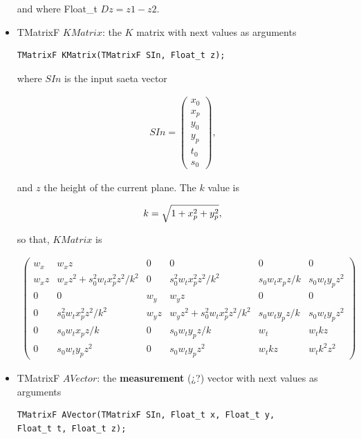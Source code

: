 \documentclass[a4paper]{book}
\begin{document}
\begin{itemize}
	and where Float\_t $Dz = z1 - z2$.
	
	
	\item TMatrixF $KMatrix$: the $K$ matrix with next values as arguments
	
	\begin{lstlisting}
TMatrixF KMatrix(TMatrixF SIn, Float_t z);
	\end{lstlisting}
	
	where $SIn$ is the input saeta vector
	
	\begin{align*}
	SIn = \left(
	\begin{array}{c}
	x_0\\
	x_p\\
	y_0\\
	y_p\\
	t_0\\
	s_0
	\end{array} \right),
	\end{align*}
	
	and $z$ the height of the current plane. The $k$ value is
	
	\begin{equation}
	\notag
	k = \sqrt{1 + x_p^2 + y_p^2},
	\end{equation}
	
	so that, $KMatrix$ is
	
	\begin{align*}
	\left(
	\begin{array}{cccccc}
	w_x   & w_x z & 0 & 0 & 0 & 0\\
	w_x z & w_x z^2 + s_0^2 w_t x_p^2 z^2/k^2 & 0 & s_0^2 w_t x_p^2 z^2 /k^2 & s_0 w_t x_p z/k & s_0 w_t y_p z^2 \\
	0 & 0 & w_y & w_y z & 0 & 0\\
	0 & s_0^2 w_t x_p^2 z^2 /k^2 & w_y z & w_y z^2 + s_0^2 w_t x_p^2 z^2/k^2 & s_0 w_t y_p z/k & s_0 w_t y_p z^2\\
	0 & s_0 w_t x_p z/k & 0 & s_0 w_t y_p z/k & w_t & w_t k z\\
	0 & s_0 w_t y_p z^2 & 0 & s_0 w_t y_p z^2 & w_t k z & w_t k^2 z^2
	\end{array} \right)
	\end{align*}
	
	\item TMatrixF $AVector$: the \textbf{measurement} (¿?) vector with next values as arguments
	
	\begin{lstlisting}
TMatrixF AVector(TMatrixF SIn, Float_t x, Float_t y, 
Float_t t, Float_t z);
	\end{lstlisting}
	

\end{itemize}
\end{document}
